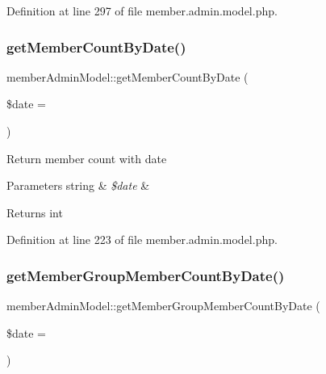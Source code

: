 Definition at line 297 of file member.\+admin.\+model.\+php.

\mbox{\label{classmemberAdminModel_a53e4d56d174b1a188878a8adeba2c37f}} 
\subsubsection{\texorpdfstring{get\+Member\+Count\+By\+Date()}{getMemberCountByDate()}}
{\footnotesize\ttfamily member\+Admin\+Model\+::get\+Member\+Count\+By\+Date (\begin{DoxyParamCaption}\item[{}]{\$date = {\ttfamily \textquotesingle{}\textquotesingle{}} }\end{DoxyParamCaption})}

Return member count with date


\begin{DoxyParams}[1]{Parameters}
string & {\em \$date} & \\
\hline
\end{DoxyParams}
\begin{DoxyReturn}{Returns}
int 
\end{DoxyReturn}


Definition at line 223 of file member.\+admin.\+model.\+php.

\mbox{\label{classmemberAdminModel_a9c6795c459c9657539e2f09b36339522}} 
\subsubsection{\texorpdfstring{get\+Member\+Group\+Member\+Count\+By\+Date()}{getMemberGroupMemberCountByDate()}}
{\footnotesize\ttfamily member\+Admin\+Model\+::get\+Member\+Group\+Member\+Count\+By\+Date (\begin{DoxyParamCaption}\item[{}]{\$date = {\ttfamily \textquotesingle{}\textquotesingle{}} }\end{DoxyParamCaption})}

